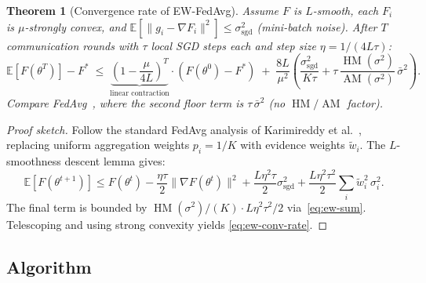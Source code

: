 \documentclass[11pt,a4paper]{article}
\newtheorem{theorem}{Theorem}[section]
\DeclareMathOperator{\AM}{AM}
\DeclareMathOperator{\HM}{HM}
\newcommand{\E}{\mathbb{E}}
\newcommand{\norm}[1]{\|#1\|}
\begin{document}
\begin{theorem}[Convergence rate of EW-FedAvg]\label{thm:ew-convergence}
Assume $F$ is $L$-smooth, each $F_i$ is $\mu$-strongly convex, and
$\E[\norm{g_i - \nabla F_i}^2] \leq \sigma_{\text{sgd}}^2$ (mini-batch
noise). After $T$ communication rounds with $\tau$ local SGD steps each
and step size $\eta = 1 / (4L\tau)$:
\begin{equation}\label{eq:ew-conv-rate}
  \E[F(\theta^T)] - F^*
  \;\leq\; \underbrace{\left(1 - \frac{\mu}{4L}\right)^T}_{\text{linear contraction}}
  \cdot (F(\theta^0) - F^*)
  \;+\; \frac{8L}{\mu^2}\left(
    \frac{\sigma_{\text{sgd}}^2}{K\tau}
    + \tau\,\frac{\HM(\sigma^2)}{\AM(\sigma^2)}\,\bar{\sigma}^2
  \right).
\end{equation}
Compare FedAvg~\cite{karimireddy2020}, where the second floor term is
$\tau\,\bar{\sigma}^2$ (no $\HM/\AM$ factor).
\end{theorem}

\begin{proof}[Proof sketch]
Follow the standard FedAvg analysis of Karimireddy et al.~\cite{karimireddy2020},
replacing uniform aggregation weights $p_i = 1/K$ with evidence weights
$\tilde{w}_i$. The $L$-smoothness descent lemma gives:
\[
  \E[F(\theta^{t+1})] \leq F(\theta^t)
    - \frac{\eta\tau}{2}\norm{\nabla F(\theta^t)}^2
    + \frac{L\eta^2\tau}{2}\sigma_{\text{sgd}}^2
    + \frac{L\eta^2\tau^2}{2}\sum_i \tilde{w}_i^2\,\sigma_i^2.
\]
The final term is bounded by $\HM(\sigma^2)/(K) \cdot L\eta^2\tau^2 / 2$
via~\eqref{eq:ew-sum}. Telescoping and using strong convexity yields
\eqref{eq:ew-conv-rate}.
\end{proof}

\subsection{Algorithm}
\end{document}
